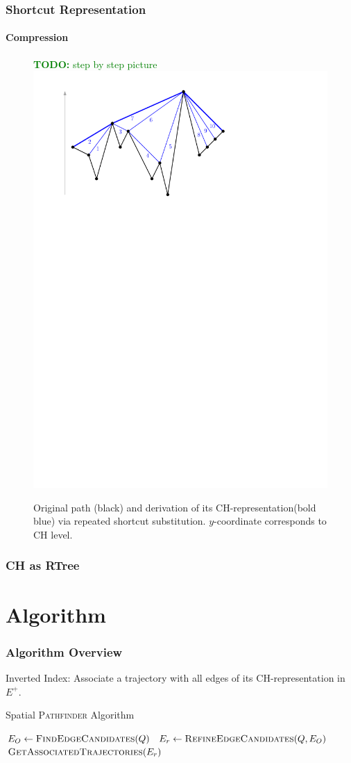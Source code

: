 \documentclass{beamer}
\newcommand{\TODO}[1]{\noindent\textcolor{green}{\textbf{TODO:} #1}}
\newcommand{\pathfinder}{\textsc{Pathfinder}\xspace}
\newcommand{\findEdgeCandidates}{FindEdgeCandidates\xspace}
\newcommand{\refineEdgeCandidates}{RefineEdgeCandidates\xspace}
\newcommand{\getAssociatedTrajectories}{GetAssociatedTrajectories\xspace}
\newcommand{\chrep}{CH-representation\xspace}
\begin{document}
\begin{frame}
	\frametitle{Shortcut Representation}
	\framesubtitle{Compression}
	\begin{figure}
		\TODO{step by step picture}
		\includegraphics[width=.76\columnwidth]{images/toch}
		\caption{Original path (black) and derivation of its \chrep (bold blue) via repeated shortcut substitution. $y$-coordinate corresponds to CH level.}
	\end{figure}
\end{frame}

\begin{frame}
	\frametitle{CH as RTree}
\end{frame}

\section{Algorithm}

\begin{frame}
	\frametitle{Algorithm Overview}
	Inverted Index: Associate a trajectory with all edges of its \chrep in $E^+$.
	\begin{algorithm}[H]
		{\small
			\caption{Spatial \pathfinder Algorithm}
			\begin{algorithmic}[1]
				 \pause
				\State $E_O \gets \Call{\findEdgeCandidates}{Q}$ \label{line:edge_revrieval} \pause
				\State $E_r \gets \Call{\refineEdgeCandidates}{Q, E_O}$ \pause
				\State \Return $\Call{\getAssociatedTrajectories}{E_r}$
				\EndProcedure
			\end{algorithmic}
			\label{alg:spatial_pathfinder}
		}
	\end{algorithm}
\end{frame}
\end{document}
